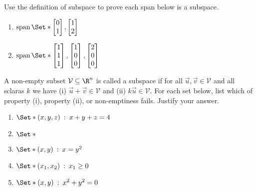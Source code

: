 \begin{exercises}
\begin{problist}
		\prob Use the definition of subspace to prove each span below is a subspace.
		\begin{enumerate}
			\item $\Span\Set*{\mat{0\\1}, \mat{1\\2}}$
			\item $\Span\Set*{\mat{1\\1\\1}, \mat{1\\0\\0}, \mat{2\\0\\0}}$
		\end{enumerate}
		
		\prob
		A non-empty subset $\mathcal V \subseteq \R^n$ is called a subspace if
		for all $\vec u, \vec v \in \mathcal V$ and all sclaras $k$ we have
			(i) $\vec u + \vec v \in \mathcal V$ and
			(ii) $k\vec u \in \mathcal V$.
			For each set below, list which of property (i), property (ii), or non-emptiness fails.
			Justify your answer.
		\begin{enumerate}
			\item $\Set*{(x,y,z)\given x+y+z=4}$
			\item $\Set*{}$
			\item $\Set*{(x,y)\given x=y^2}$
			\item $\Set*{(x_1,x_2)\given x_1 \geq 0}$
			\item $\Set*{(x,y)\given x^2+y^2=0}$
		\end{enumerate}


\end{problist}
\end{exercises}
